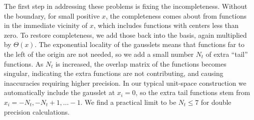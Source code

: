 \documentclass[aps,pra,reprint,longbibliography,nofootinbib]{revtex4-2}
\begin{document}
The first step in addressing these problems is fixing the incompleteness.  Without the boundary, for small positive $x$, the completeness comes about from functions in the immediate vicinity of $x$, which includes functions with centers less than zero. To restore completeness, we add those back into the basis, again multiplied by $\Theta(x)$.  The exponential locality of the gausslets means that functions far to the left of the origin are not needed, so we add a small number $N_t$ of extra ``tail'' functions.  As $N_t$ is increased, the overlap matrix of the functions becomes singular, indicating the extra functions are not contributing, and causing inaccuracies requiring higher precision. In our typical unit-space construction we automatically include the gausslet at $x_i=0$, so the extra tail functions stem from 
$x_i=-N_t,-N_t+1,\ldots -1$.  We find a practical limit to be $N_t \le 7$ for double precision calculations.


\end{document}
